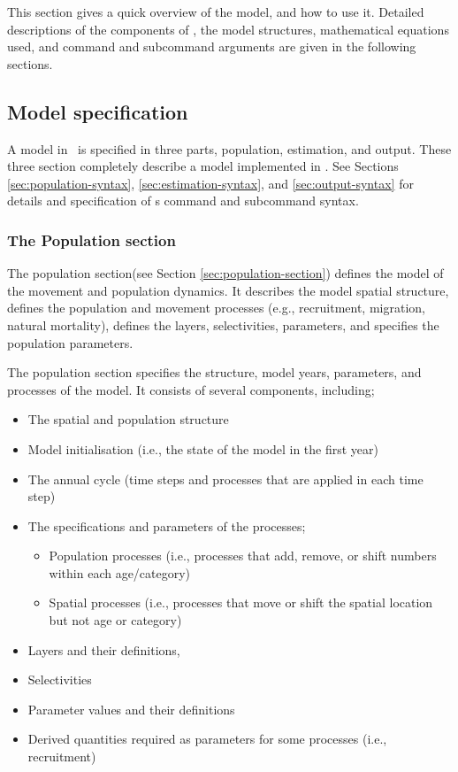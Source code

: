 This section gives a quick overview of the model, and how to use it. Detailed descriptions of the components of \SPM, the model structures, mathematical equations used, and command and subcommand arguments are given in the following sections.

\subsection{Model specification}

A model in \SPM\ is specified in three parts, population, estimation, and output. These three section completely describe a model implemented in \SPM. See Sections \ref{sec:population-syntax}, \ref{sec:estimation-syntax}, and \ref{sec:output-syntax} for details and specification of \SPM s command and subcommand syntax. 

\subsubsection{The Population section}

The population section(see Section \ref{sec:population-section}) defines the model of the movement and population dynamics. It describes the model spatial structure, defines the population and movement processes (e.g., recruitment, migration, natural mortality), defines the layers, selectivities, parameters, and specifies the population parameters.

The population section specifies the structure, model years, parameters, and processes of the model. It consists of several components, including;
\begin{itemize}
  \item The spatial and population structure
  \item Model initialisation (i.e., the state of the model in the first year)
  \item The annual cycle (time steps and processes that are applied in each time step)
  \item The specifications and parameters of the processes;
  \begin{itemize}
    \item Population processes (i.e., processes that add, remove, or shift numbers within each age/category)
    \item Spatial processes (i.e., processes that move or shift the spatial location but not age or category)
  \end{itemize}
  \item Layers and their definitions,
  \item Selectivities
  \item Parameter values and their definitions
  \item Derived quantities required as parameters for some processes (i.e., recruitment)
\end{itemize}

